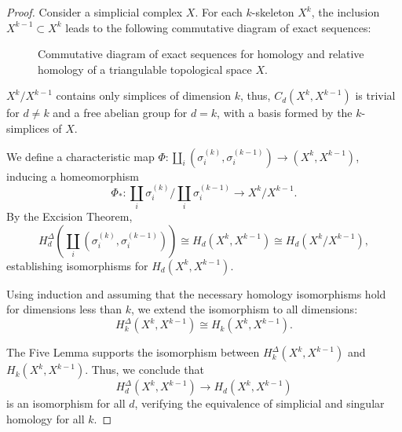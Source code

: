 \begin{proof}
	Consider a simplicial complex $X$. For each $k$-skeleton $X^{k}$, the inclusion $X^{k-1} \subset X^{k}$ leads to the following commutative diagram of exact sequences:
			
	\begin{figure}[h]
		\centering
		\caption{Commutative diagram of exact sequences for homology and relative homology of a triangulable topological space $X$.}
	\end{figure}
			
	$X^{k}/X^{k-1}$ contains only simplices of dimension $k$, thus, $C_{d}(X^{k}, X^{k-1})$ is trivial for $d \neq k$ and a free abelian group for $d = k$, with a basis formed by the $k$-simplices of $X$.
			
	We define a characteristic map $\Phi: \coprod_{i}(\sigma^{(k)}_{i}, \sigma^{(k-1)}_{i}) \rightarrow (X^{k}, X^{k-1})$, inducing a homeomorphism
	\[
		\Phi_\ast: \coprod_{i} \sigma^{(k)}_{i}/\coprod_{i} \sigma^{(k-1)}_{i} \rightarrow X^{k}/X^{k-1}.
	\]
	By the Excision Theorem, 
	\[
		H^\Delta_{d}\left(\coprod_{i} (\sigma^{(k)}_{i}, \sigma^{(k-1)}_{i})\right) \cong H_{d}(X^{k}, X^{k-1}) \cong H_{d}(X^{k}/X^{k-1}),
	\]
	establishing isomorphisms for $H_{d}(X^{k}, X^{k-1})$.
			
	Using induction and assuming that the necessary homology isomorphisms hold for dimensions less than $k$, we extend the isomorphism to all dimensions:
	\begin{equation}
		H_{k}^{\Delta}(X^{k},X^{k-1}) \cong H_{k}(X^{k},X^{k-1}).
	\end{equation}
			
	The Five Lemma supports the isomorphism between $H_{k}^{\Delta}(X^{k}, X^{k-1})$ and $H_{k}(X^{k}, X^{k-1})$. Thus, we conclude that 
	\[
		H_{d}^{\Delta}(X^{k}, X^{k-1}) \rightarrow H_{d}(X^{k}, X^{k-1})
	\]
	is an isomorphism for all $d$, verifying the equivalence of simplicial and singular homology for all $k$.
\end{proof}